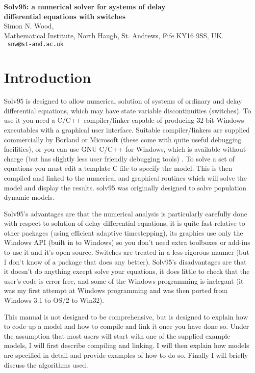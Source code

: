 \documentclass[10pt] {article}
\begin{document}
\begin{center}
{\Large \bf Solv95: a numerical solver for systems of delay \\
differential equations with switches}\\
\vspace{0.3cm}
Simon N. Wood,\\ Mathematical Institute, North Haugh, St. Andrews, Fife KY16 9SS, UK.\\ {\tt %
snw@st-and.ac.uk}
\end{center}

\tableofcontents

\section{Introduction}

Solv95 is designed to allow numerical solution of systems of ordinary and delay differential %
equations, which may have state variable discontinuities (switches). To use it you need a C/C++ %
compiler/linker capable of producing 32 bit Windows executables with a graphical user interface. %
Suitable compiler/linkers are supplied commercially by Borland or Microsoft (these come with %
quite useful debugging facilities), or you can use GNU C/C++ for Windows, which is available %
without charge (but has slightly less user friendly debugging tools) . To solve a set of %
equations you must edit a template C file to specify the model. This is then compiled and linked %
to the numerical and graphical routines which will solve the model and display the results. %
solv95 was originally designed to solve population dynamic models.

Solv95's advantages are that the numerical analysis is particularly carefully done with respect %
to solution of delay differential equations, it is quite fast relative to other packages (using %
efficient adaptive timestepping), its graphics use only the Windows API (built in to Windows) so %
you don't need extra toolboxes or add-ins to use it and it's open source. Switches are treated in %
a less rigorous manner (but I don't know of a package that does any better). Solv95's %
disadvantages are that it doesn't do anything except solve your equations, it does little to %
check that the user's code is error free, and some of the Windows programming is inelegant (it %
was my first attempt at Windows programming and was then ported from Windows 3.1 to OS/2 to %
Win32).

This manual is not designed to be comprehensive, but is designed to explain how to code up a %
model and how to compile and link it once you have done so. Under the assumption that most users %
will start with one of the supplied example models, I will first describe compiling and linking. %
I will then explain how models are specified in detail 
and provide examples of how to do so. Finally I will briefly discuss the algorithms used.   
\end{document}
